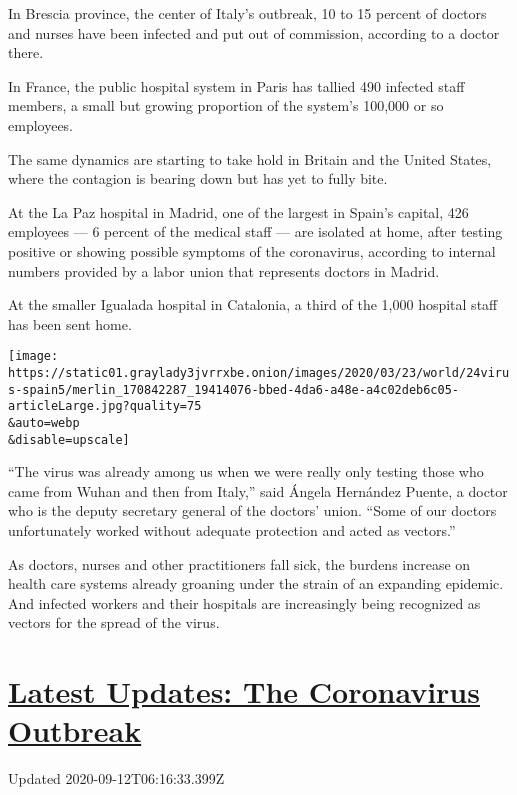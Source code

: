 In Brescia province, the center of Italy's outbreak, 10 to 15 percent of
doctors and nurses have been infected and put out of commission,
according to a doctor there.

In France, the public hospital system in Paris has tallied 490 infected
staff members, a small but growing proportion of the system's 100,000 or
so employees.

The same dynamics are starting to take hold in Britain and the United
States, where the contagion is bearing down but has yet to fully bite.

At the La Paz hospital in Madrid, one of the largest in Spain's capital,
426 employees --- 6 percent of the medical staff --- are isolated at
home, after testing positive or showing possible symptoms of the
coronavirus, according to internal numbers provided by a labor union
that represents doctors in Madrid.

At the smaller Igualada hospital in Catalonia, a third of the 1,000
hospital staff has been sent home.

\texttt{[image: https://static01.graylady3jvrrxbe.onion/images/2020/03/23/world/24virus-spain5/merlin\_170842287\_19414076-bbed-4da6-a48e-a4c02deb6c05-articleLarge.jpg?quality=75\\\&auto=webp\\\&disable=upscale]}

``The virus was already among us when we were really only testing those
who came from Wuhan and then from Italy,'' said Ángela Hernández Puente,
a doctor who is the deputy secretary general of the doctors' union.
``Some of our doctors unfortunately worked without adequate protection
and acted as vectors.''

As doctors, nurses and other practitioners fall sick, the burdens
increase on health care systems already groaning under the strain of an
expanding epidemic. And infected workers and their hospitals are
increasingly being recognized as vectors for the spread of the virus.

\hypertarget{latest-updates-the-coronavirus-outbreak}{%
\section{\texorpdfstring{\href{https://www.nytimes3xbfgragh.onion/2020/09/11/world/covid-19-coronavirus.html?action=click\&pgtype=Article\&state=default\&region=MAIN_CONTENT_1\&context=storylines_live_updates}{Latest
Updates: The Coronavirus
Outbreak}}{Latest Updates: The Coronavirus Outbreak}}\label{latest-updates-the-coronavirus-outbreak}}

Updated 2020-09-12T06:16:33.399Z

